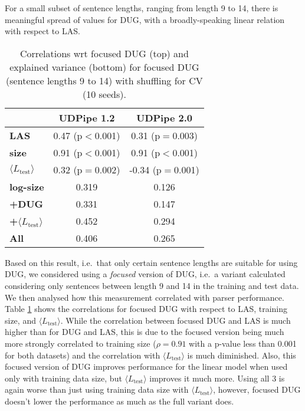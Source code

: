 \documentclass[11pt,a4paper]{article}
\newcommand{\MTL}{{$\langle L_{\textrm{test}}\rangle$}}
\begin{document}
For a small subset of sentence lengths, ranging from length 9 to 14, there is meaningful spread of values for DUG, with a broadly-speaking linear relation with respect to LAS. 
\begin{table}[b!]%
    \centering
    \small
    \begin{tabular}{lcc}
    \toprule
    & UDPipe 1.2 & UDPipe 2.0 \\
    \midrule
    \textbf{LAS} & 0.47 (p$<$0.001) & 0.31 (p$=$0.003)  \\
    \textbf{size} & 0.91 (p$<$0.001)& 0.91 (p$<$0.001) \\
    \textbf{\MTL} & 0.32 (p$=$0.002) & -0.34 (p$=$0.001) \\ \midrule
    \textbf{log-size} &  0.319 & 0.126 \\
    \textbf{+DUG} &  0.331 & 0.147 \\
    \textbf{+\MTL} & 0.452 & 0.294 \\
    \textbf{All} & 0.406 & 0.265 \\ \bottomrule
    \end{tabular}
    \caption{Correlations wrt focused DUG (top) and explained variance (bottom) for focused DUG (sentence lengths 9 to 14) with shuffling for CV (10 seeds).}
    \label{tab:focused_metrics}
\end{table}
Based on this result, i.e.\ that only certain sentence lengths are suitable for using DUG, we considered using a \textit{focused} version of DUG, i.e.\ a variant calculated considering only sentences between length 9 and 14 in the training and test data.
We then analysed how this measurement correlated with parser performance. Table \ref{tab:focused_metrics} shows the correlations for focused DUG with respect to LAS, training size, and {\MTL}. While the correlation between focused DUG and LAS is much higher than for DUG and LAS, this is due to the focused version being much more strongly correlated to training size ($\rho=0.91$ with a p-value less than 0.001 for both datasets) and the correlation with {\MTL} is much diminished. Also, this focused version of DUG improves performance for the linear model when used only with training data size, but {\MTL} improves it much more. Using all 3 is again worse than just using training data size with {\MTL}, however, focused DUG doesn't lower the performance as much as the full variant does. 
\end{document}
